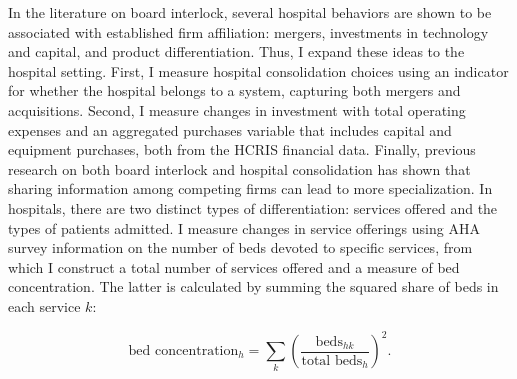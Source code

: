 \documentclass[12pt]{article}
\begin{document}

    In the literature on board interlock, several hospital behaviors are shown to be associated with established firm affiliation: mergers, investments in technology and capital, and product differentiation. Thus, I expand these ideas to the hospital setting. First, I measure hospital consolidation choices using an indicator for whether the hospital belongs to a system, capturing both mergers and acquisitions. Second, I measure changes in investment with total operating expenses and an aggregated purchases variable that includes capital and equipment purchases, both from the HCRIS financial data. Finally, previous research on both board interlock and hospital consolidation has shown that sharing information among competing firms can lead to more specialization. In hospitals, there are two distinct types of differentiation: services offered and the types of patients admitted. I measure changes in service offerings using AHA survey information on the number of beds devoted to specific services, from which I construct a total number of services offered and a measure of bed concentration. The latter is calculated by summing the squared share of beds in each service $k$:  

        $$\text{bed concentration}_h = \sum_{k}\left(\frac{\text{beds}_{hk}}{\text{total beds}_h}\right)^2.$$
\end{document}
